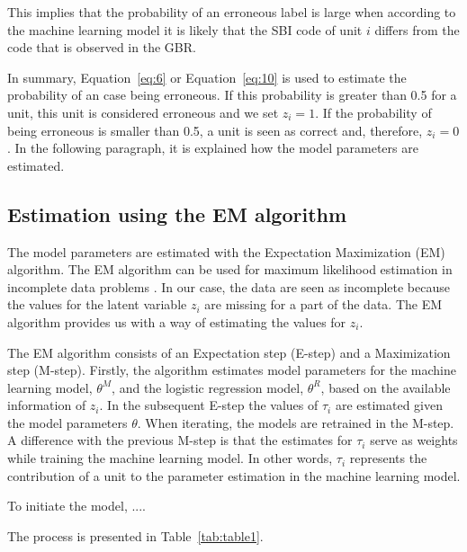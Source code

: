 \documentclass[12pt, a4paper, titlepage]{article}
\begin{document}
This implies that the probability of an erroneous label is large when according to the machine learning model it is likely that the SBI code of unit $i$ differs from the code that is observed in the GBR.

In summary, Equation~\ref{eq:6} or Equation~\ref{eq:10} is used to estimate the probability of an case being erroneous. If this probability is greater than 0.5 for a unit, this unit is considered erroneous and we set $z_i = 1$. If the probability of being erroneous is smaller than 0.5, a unit is seen as correct and, therefore, $z_i=0$. In the following paragraph, it is explained how the model parameters are estimated.


					\subsection{Estimation using the EM algorithm}
					\label{section:em}

The model parameters are estimated with the Expectation Maximization (EM) algorithm. The EM algorithm can be used for maximum likelihood estimation in incomplete data problems \citep{Rubin}. In our case, the data are seen as incomplete because the values for the latent variable $z_i$ are missing for a part of the data. The EM algorithm provides us with a way of estimating the values for $z_i$.

The EM algorithm consists of an  Expectation step (E-step) and a Maximization step (M-step). Firstly, the algorithm estimates model parameters for the machine learning model, $\theta^M$, and the logistic regression model, $\theta^R$, based on the available information of $z_i$. In the subsequent E-step the values of $\tau_i$ are estimated given the model parameters $\theta$. When iterating, the models are retrained in the M-step. A difference with the previous M-step is that the estimates for $\tau_i$ serve as weights while training the machine learning model. In other words, $\tau_i$ represents the contribution of a unit to the parameter estimation in the machine learning model. 

To initiate the model, ....

The process is presented in Table~\ref{tab:table1}.
\end{document}
